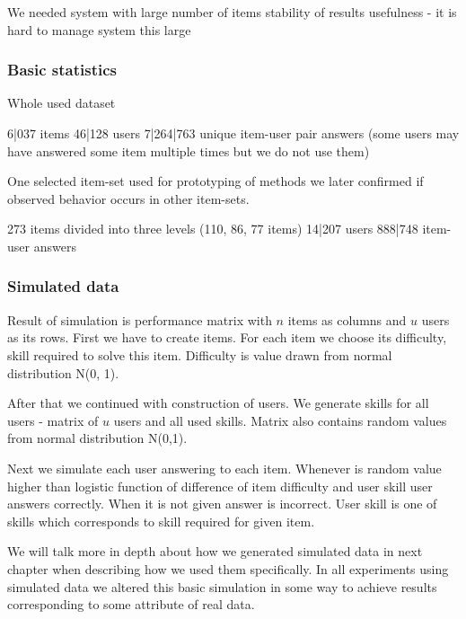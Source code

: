 \documentclass[
  digital, %
  table,   %
  nolof,     %
  nolot,     %
  nocover
]{fithesis3}
\begin{document}


We needed system with large number of items
stability of results
usefulness - it is hard to manage system this large

\subsubsection{Basic statistics}\label{basic-statistics}

Whole used dataset

6|037 items
46|128 users
7|264|763 unique item-user pair answers
  (some users may have answered some item multiple times but we do not use them)

One selected item-set used for prototyping of methods
we later confirmed if observed behavior occurs in other item-sets.

273 items
  divided into three levels (110, 86, 77 items)
14|207 users
888|748 item-user answers

\subsubsection{Simulated data}\label{simulated-data}

Result of simulation is performance matrix with $n$ items as columns and $u$ users as its rows. First we have to create items. For each item we choose its difficulty, skill required to solve this item. Difficulty is value drawn from normal distribution N(0, 1). 

After that we continued with construction of users. We generate skills for all users - matrix of $u$ users and all used skills. Matrix also contains random values from normal distribution N(0,1). 

Next we simulate each user answering to each item. Whenever is random value higher than logistic function of difference of item difficulty and user skill user answers correctly. When it is not given answer is incorrect. User skill is one of skills which corresponds to skill required for given item.  

We will talk more in depth about how we generated simulated data in next chapter when describing how we used them specifically. In all experiments using simulated data we altered this basic simulation in some way to achieve results corresponding to some attribute of real data.
\end{document}
